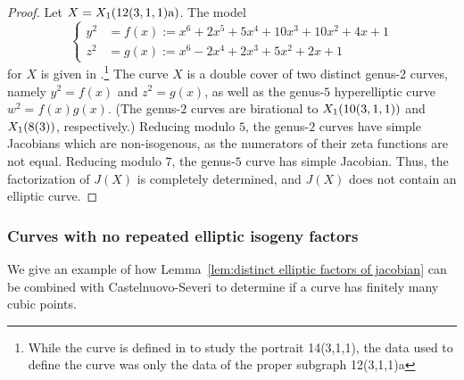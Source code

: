 \documentclass[12pt]{amsart}
\theoremstyle{definition}
\numberwithin{equation}{section}
\begin{document}
\begin{proof}
    Let $X = X_1(\rm 12(3,1,1)a)$.
    The model
    \[
        \left\{
        \begin{split}
            y^2 &= f(x) := x^6 + 2x^5 + 5x^4 + 10x^3 + 10x^2 + 4x + 1\\
            z^2 &= g(x) := x^6 - 2x^4 + 2x^3 + 5x^2 + 2x + 1
        \end{split}
        \right.
    \]
    for $X$ is given in \cite[Lemma 3.53]{doyle/faber/krumm:2014}.\footnote{While the curve is defined in \cite[Lemma 3.53]{doyle/faber/krumm:2014} to study the portrait 14(3,1,1), the data used to define the curve was only the data of the proper subgraph 12(3,1,1)a}
    The curve $X$ is a double cover of two distinct genus-$2$ curves, namely $y^2 = f(x)$ and $z^2 = g(x)$, as well as the genus-$5$ hyperelliptic curve $w^2 = f(x)g(x)$. (The genus-$2$ curves are birational to $X_1(\rm 10(3,1,1))$ and $X_1(\rm8(3))$, respectively.) Reducing modulo $5$, the genus-$2$ curves have simple Jacobians which are non-isogenous, as the numerators of their zeta functions are not equal. Reducing modulo $7$, the genus-$5$ curve has simple Jacobian. Thus, the factorization of $J(X)$ is completely determined, and $J(X)$ does not contain an elliptic curve.
\end{proof}

\subsubsection{Curves with no repeated elliptic isogeny factors}

We give an example of how Lemma~\ref{lem:distinct elliptic factors of jacobian} can be combined with Castelnuovo-Severi to determine if a curve has finitely many cubic points.
\end{document}
